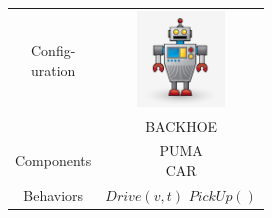 \documentclass{standalone}
\newcommand{\picHeight}{1in}
\begin{document}
        \begin{tabular}{| c | c |}
            \hline
            \pbox{20cm}{Config-\\uration} &
            \includegraphics[height=\picHeight]{robot-character.jpg} \\
            ~ & BACKHOE \\ \hline
            Components & \pbox{20cm}{PUMA \\ CAR}\\ \hline
            Behaviors &
            \pbox{20cm}{\(Drive(v,t)\) \\ \(PickUp()\)} \\ \hline
        \end{tabular}
\end{document}
